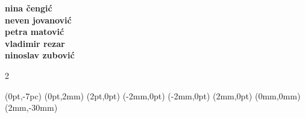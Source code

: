 \documentclass{article}
\begin{document}
  \NewCoffin \result
  \NewCoffin \aaa
  \NewCoffin \bbb
  \NewCoffin \ddd
  \NewCoffin \eee
  \NewCoffin \fff
  \NewCoffin {}
  \NewCoffin {}
  \NewCoffin {}

\SetHorizontalCoffin \result {}
\SetHorizontalCoffin {}
\SetHorizontalCoffin {}
\SetHorizontalCoffin {}
\SetHorizontalCoffin \eee {}
\SetVerticalCoffin \fff {140pt}
                 {\raggedright {\color{gray} \fontsize{13}{14}\sffamily\bfseries
                 nina čengić\\
                 neven jovanović\\
                 petra matović\\
		 vladimir rezar\\
                 ninoslav zubović\\
                 }}

\RotateCoffin {}

\ScaleCoffin {} {2}

\SetHorizontalCoffin {}
\SetHorizontalCoffin {}
\SetHorizontalCoffin {}


\JoinCoffins \result                \aaa	[B,l](0pt,-7pc)
\JoinCoffins {} (0pt,2mm)
\JoinCoffins {} \bbb     [B,r](2pt,0pt)
\JoinCoffins {} (-2mm,0pt)
\JoinCoffins {} \fff     [t,r](-2mm,0pt)
\JoinCoffins {} (2mm,0pt)
\JoinCoffins {} \ddd     [B,r](0mm,0mm)
\JoinCoffins {} \eee    [t,r](2mm,-30mm)
\TypesetCoffin \result
\end{document}
